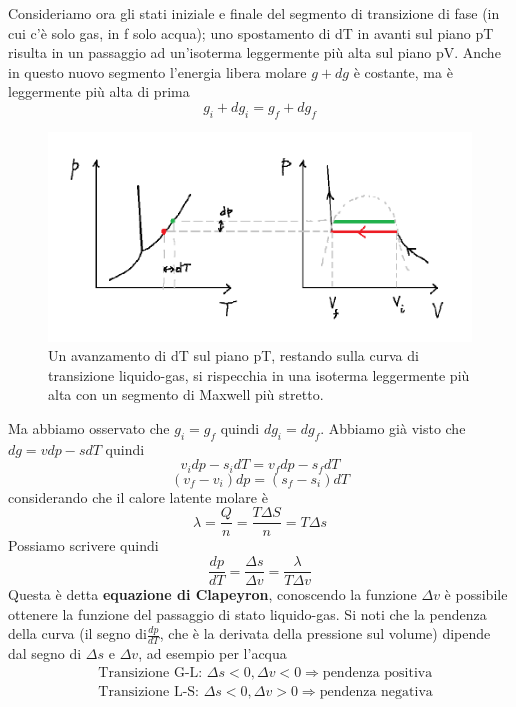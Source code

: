 \documentclass[
10pt, %
a4paper, %
oneside, %
headinclude,footinclude, %
BCOR5mm, %
]{scrartcl}
\begin{document}
Consideriamo ora gli stati iniziale e finale del segmento di transizione di fase (in cui c'è solo gas, in f solo acqua); uno spostamento di dT in avanti sul piano pT risulta in un passaggio ad un'isoterma leggermente più alta sul piano pV. Anche in questo nuovo segmento l'energia libera molare \(g+dg\) è costante, ma è leggermente più alta di prima
\[g_i + dg_i = g_f + dg_f\]
\begin{figure}[h!]
	\centering
	\includegraphics[width=0.5\linewidth]{../images/equaz_passaggio_stato(1)}
	\caption{Un avanzamento di dT sul piano pT, restando sulla curva di transizione liquido-gas, si rispecchia in una isoterma leggermente più alta con un segmento di Maxwell più stretto.}
	\label{fig:equazpassaggiostato1}
\end{figure}
\FloatBarrier
Ma abbiamo osservato che \(g_i = g_f\) quindi \(dg_i = dg_f\). Abbiamo già visto che \(dg = vdp - sdT\) quindi
\[v_idp - s_idT = v_f dp -s_fdT\]
\[(v_f - v_i)dp = (s_f -s_i)dT\]
considerando che il calore latente molare è
\[\lambda= \frac{Q}{n}=\frac{T\Delta S}{n}=T\Delta s\]
Possiamo scrivere quindi
\[\frac{dp}{dT}=\frac{\Delta s}{\Delta v} = \frac{\lambda}{T\Delta v}\]
Questa è detta \textbf{equazione di Clapeyron}, conoscendo la funzione \(\Delta v\) è possibile ottenere la funzione del passaggio di stato liquido-gas. Si noti che la pendenza della curva (il segno di$\frac{dp}{dT}$, che è la derivata della pressione sul volume) dipende dal segno di $\Delta s$ e $\Delta v$, ad esempio per l'acqua
\begin{align*}
	&\text{Transizione G-L: }\Delta s< 0, \Delta v < 0 \Rightarrow \text{pendenza positiva}\\
	&\text{Transizione L-S: }\Delta s< 0, \Delta v > 0 \Rightarrow \text{pendenza negativa}
\end{align*}

\newpage
\end{document}
